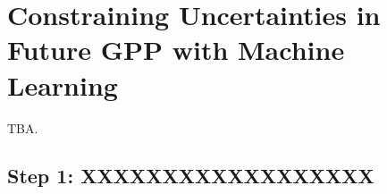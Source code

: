 


\chapter{Constraining Uncertainties in Future \acl{GPP} with Machine Learning}
\label{ch:06:paper_gpp}

TBA.


\section{Step 1: XXXXXXXXXXXXXXXXXX}
\label{sec:06:step_1}
